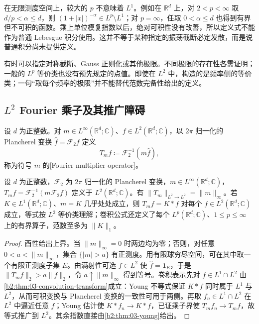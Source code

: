 在无限测度空间上，较大的 \(p\) 不意味着 \(L^1\)。例如在 \(\mathbb R^d\) 上，对 \(2<p<\infty\) 取 \(d/p<\alpha\leq d\)，则 \((1+|x|)^{-\alpha}\in L^p\setminus L^1\)；对 \(p=\infty\)，任取 \(0<\alpha\leq d\) 也得到有界但不可积的函数。乘上单位模复指数以后，绝对可积性没有改善，所以定义式不能作为普通 Lebesgue 积分使用。这并不等于某种指定的振荡截断必定发散，而是说普通积分尚未提供定义。

\ProseParagraphBreak

有时可以指定对称截断、Gauss 正则化或其他极限。不同极限的存在性各需证明；一般的 \(L^p\) 等价类也没有预先规定的点值。即使在 \(L^2\) 中，构造的是频率侧的等价类；一句“取每个频率的极限”并不能替代范数完备性给出的定义。

\subsection{\texorpdfstring{\(L^2\)}{L²} Fourier 乘子及其推广障碍}
\label{b2:subsec:040303}

\begin{definition}\label{b2:def:04-multiplier}
设 \(d\) 为正整数。对 \(m\in L^\infty(\mathbb R^d;\mathbb C)\)、\(f\in L^2(\mathbb R^d;\mathbb C)\)，以 \(2\pi\) 归一化的 Plancherel 变换 \(\widehat f=\mathcal F_2f\) 定义
\[
 T_mf\coloneqq\mathcal F_2^{-1}(m\widehat f),
\]
称为符号 \(m\) 的[Fourier multiplier operator]。
\end{definition}

\begin{proposition}\label{b2:prop:04-multiplier-norm}
设 \(d\) 为正整数，\(\mathcal F_2\) 为 \(2\pi\) 归一化的 Plancherel 变换，\(m\in L^\infty(\mathbb R^d;\mathbb C)\)，\(T_mf=\mathcal F_2^{-1}(m\mathcal F_2f)\) 定义于 \(L^2(\mathbb R^d;\mathbb C)\)。有 \(\|T_m\|_{L^2\to L^2}=\|m\|_\infty\)。若 \(K\in L^1(\mathbb R^d;\mathbb C)\)、\(m=\widehat K\) 几乎处处成立，则 \(T_mf=K*f\) 对每个 \(f\in L^2(\mathbb R^d;\mathbb C)\) 成立，等式按 \(L^2\) 等价类理解；卷积公式还定义了每个 \(L^p(\mathbb R^d;\mathbb C)\)、\(1\leq p\leq\infty\) 上的有界算子，范数至多为 \(\|K\|_1\)。
\end{proposition}
\begin{proof}
酉性给出上界。当 \(\|m\|_\infty=0\) 时两边均为零；否则，对任意 \(0<a<\|m\|_\infty\)，集合 \(\{|m|>a\}\) 有正测度。用有限球穷尽空间，可在其中取一个有限正测度子集 \(E\)。由满射性可选 \(f\in L^2\) 使 \(\widehat f=\mathbf1_E\)，于是 \(\|T_mf\|_2>a\|f\|_2\)，令 \(a\uparrow\|m\|_\infty\) 得到等号。卷积表示先对 \(f\in L^1\cap L^2\) 由\cref{b2:thm:03-convolution-transform}成立：Young 不等式保证 \(K*f\) 同时属于 \(L^1\) 与 \(L^2\)，从而可积变换与 Plancherel 变换的一致性可用于两侧。再取 \(f_n\in L^1\cap L^2\) 在 \(L^2\) 中逼近任意 \(f\)；Young 估计使 \(K*f_n\to K*f\)，已证乘子界使 \(T_mf_n\to T_mf\)，故等式推广到 \(L^2\)。其余指数直接由\cref{b2:thm:03-young}给出。
\end{proof}

